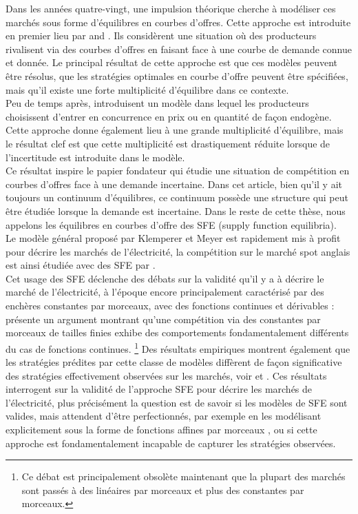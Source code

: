 Dans les années quatre-vingt, une impulsion théorique cherche à modéliser ces marchés sous forme d'équilibres en courbes d'offres. Cette approche est introduite en premier lieu par \cite{grossman1981nash} and \cite{hart1982imperfect}. Ils considèrent une situation où des producteurs rivalisent via des courbes d'offres en faisant face à une courbe de demande connue et donnée. Le principal résultat de cette approche est que ces modèles peuvent être résolus, que les stratégies optimales en courbe d'offre peuvent être spécifiées, mais qu'il existe une forte multiplicité d'équilibre dans ce contexte.\\

Peu de temps après, \cite{klemperer1986price} introduisent un modèle dans lequel les producteurs choisissent d'entrer en concurrence en prix ou en quantité de façon endogène. Cette approche donne également lieu à une grande multiplicité d'équilibre, mais le résultat clef est que cette multiplicité est drastiquement réduite lorsque de l'incertitude est introduite dans le modèle.\\

Ce résultat inspire le papier fondateur \cite{KM} qui étudie une situation de compétition en courbes d'offres face à une demande incertaine. Dans cet article, bien qu'il y ait toujours un continuum d'équilibres, ce continuum possède une structure qui peut être étudiée lorsque la demande est incertaine. Dans le reste de cette thèse, nous appelons les équilibres en courbes d'offre des SFE (supply function equilibria).\\

Le modèle général proposé par Klemperer et Meyer est rapidement mis à profit pour décrire les marchés de l'électricité, la compétition sur le marché spot anglais est ainsi étudiée avec des SFE par \cite{Newgreen}.\\

Cet usage des SFE déclenche des débats sur la validité qu'il y a à décrire le marché de l'électricité, à l'époque encore principalement caractérisé par des enchères constantes par morceaux, avec des fonctions continues et dérivables : \cite{von1993spot} présente un argument montrant qu'une compétition via des constantes par morceaux de tailles finies exhibe des comportements fondamentalement différents du cas de fonctions continues. \footnote{Ce débat est principalement obsolète maintenant que la plupart des marchés sont passés à des linéaires par morceaux et plus des constantes par morceaux.} Des résultats empiriques montrent également que les stratégies prédites par cette classe de modèles diffèrent de façon significative des stratégies effectivement observées sur les marchés, voir \cite{willems2009cournot} et \cite{willems2009cournot}. Ces résultats interrogent sur la validité de l'approche SFE pour décrire les marchés de l'électricité, plus précisément la question est de savoir si les modèles de SFE sont valides, mais attendent d'être perfectionnés, par exemple en les modélisant explicitement sous la forme de fonctions affines par morceaux \cite{baldick2004theory}, ou si cette approche est fondamentalement incapable de capturer les stratégies observées.\\

